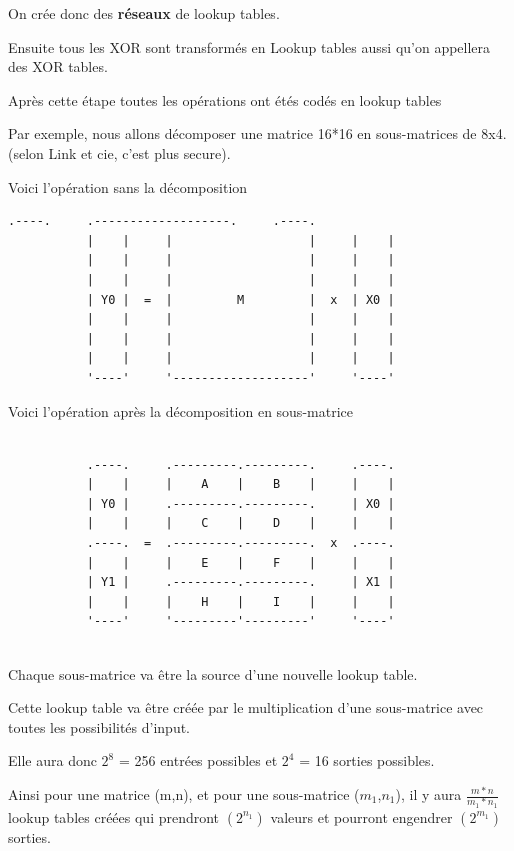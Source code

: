 \documentclass[a4paper,12pt]{article}
\begin{document}
On crée donc des \textbf{réseaux} de lookup tables.

Ensuite tous les XOR sont transformés en Lookup tables aussi qu'on appellera des XOR tables.

Après cette étape toutes les opérations ont étés codés en lookup tables

Par exemple, nous allons décomposer une matrice 16*16 en sous-matrices de 8x4. (selon Link et cie, c'est plus secure).

Voici l'opération sans la décomposition

\begin{Verbatim}[samepage=true]
           .----.     .-------------------.     .----.
           |    |     |                   |     |    |
           |    |     |                   |     |    |
           |    |     |                   |     |    |
           | Y0 |  =  |         M         |  x  | X0 |
           |    |     |                   |     |    |
           |    |     |                   |     |    |
           |    |     |                   |     |    |
           '----'     '-------------------'     '----'

\end{Verbatim}

Voici l'opération après la décomposition en sous-matrice

\begin{Verbatim}[samepage=true]

           .----.     .---------.---------.     .----.
           |    |     |    A    |    B    |     |    |
           | Y0 |     .---------.---------.     | X0 |
           |    |     |    C    |    D    |     |    |
           .----.  =  .---------.---------.  x  .----.
           |    |     |    E    |    F    |     |    |
           | Y1 |     .---------.---------.     | X1 |
           |    |     |    H    |    I    |     |    |
           '----'     '---------'---------'     '----'
           
\end{Verbatim}

Chaque sous-matrice va être la source d'une nouvelle lookup table.

Cette lookup table va être créée par le multiplication d'une sous-matrice avec toutes les possibilités d'input.

Elle aura donc $2^8$ = 256 entrées possibles et $2^4$ = 16 sorties possibles.

Ainsi pour une matrice (m,n), et pour une sous-matrice ($m_{1}$,$n_{1}$), il y aura     $\frac{m*n}{m_{1}*n_{1}}$ lookup tables créées qui prendront $(2^{n_{1}})$ valeurs et pourront engendrer $(2^{m_{1}})$ sorties.
\end{document}

